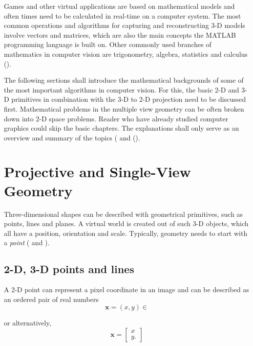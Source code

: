 Games and other virtual applications are based on mathematical models and often times need to be calculated in real-time on a computer system. The most common operations and algorithms for capturing and reconstructing 3-D models involve vectors and matrices, which are also the main concepts the MATLAB programming language is built on. Other commonly used branches of mathematics in computer vision are trigonometry, algebra, statistics and calculus (\cite[p.165]{Gregory.2014}).

The following sections shall introduce the mathematical backgrounds of some of the most important algorithms in computer vision. For this, the basic 2-D and 3-D primitives in combination with the 3-D to 2-D projection need to be discussed first. Mathematical problems in the multiple view geometry can be often broken down into 2-D space problems. Reader who have already studied computer graphics could skip the basic chapters. The explanations shall only serve as an overview and summary of the topics (\cite[p.29]{Szeliski.2011} and (\cite[p.165 et seq.]{Gregory.2014}).
\section{Projective and Single-View Geometry}
Three-dimensional shapes can be described with geometrical primitives, such as points, lines and planes. A virtual world is created out of such 3-D objects, which all have a position, orientation and scale. Typically, geometry needs to start with a \textit{point} (\cite[p.29 et seqq.]{Szeliski.2011} and \cite[p.166 et seqq.]{Gregory.2014}).

\subsection{2-D, 3-D points and lines}
A 2-D point can represent a pixel coordinate in an image and can be described as an ordered pair of real numbers 
\begin{equation}
\mathbf{x} = (x,y)\in
\end{equation}

or alternatively, 
\begin{equation} 
\mathbf{x}=
  \begin{bmatrix}
   x \\
   y.
  \end{bmatrix}
\end{equation}


